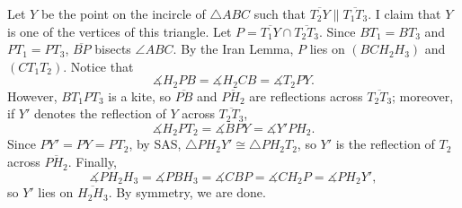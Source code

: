 Let $Y$ be the point on the incircle of $\triangle ABC$ such that $\overline{T_2Y}\parallel\overline{T_1T_3}$. I claim that $Y$ is one of the vertices of this triangle. Let $P=\overline{T_1Y}\cap\overline{T_2T_3}$. Since $BT_1=BT_3$ and $PT_1=PT_3$, $\overline{BP}$ bisects $\angle ABC$. By the Iran Lemma, $P$ lies on $(BCH_2H_3)$ and $(CT_1T_2)$. Notice that \[\measuredangle H_2PB=\measuredangle H_2CB=\measuredangle T_2PY.\]However, $BT_1PT_3$ is a kite, so $\overline{PB}$ and $\overline{PH_2}$ are reflections across $\overline{T_2T_3}$; moreover, if $Y'$ denotes the reflection of $Y$ across $\overline{T_2T_3}$, \[\measuredangle H_2PT_2=\measuredangle BPY=\measuredangle Y'PH_2.\]Since $PY'=PY=PT_2$, by SAS, $\triangle PH_2Y'\cong\triangle PH_2T_2$, so $Y'$ is the reflection of $T_2$ across $\overline{PH_2}$. Finally, \[\measuredangle PH_2H_3=\measuredangle PBH_3=\measuredangle CBP=\measuredangle CH_2P=\measuredangle PH_2Y',\]so $Y'$ lies on $\overline{H_2H_3}$. By symmetry, we are done.
